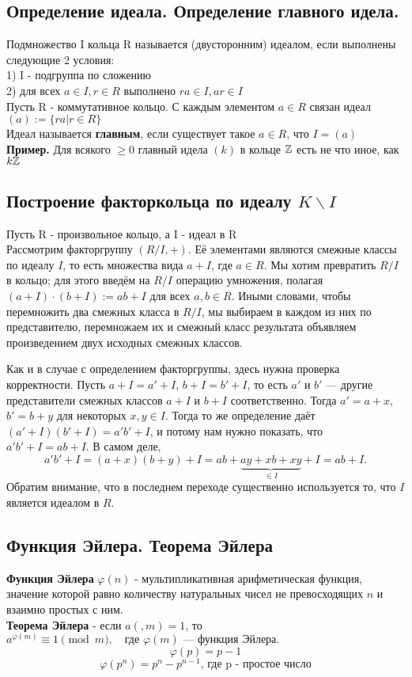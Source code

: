 \subsection{Определение идеала. Определение главного идела.}
Подмножество I кольца R называется (двусторонним) идеалом, если выполнены следующие 2 условия: \\
1) I - подгруппа по сложению \\
2) для всех $a\in I, r\in R$ выполнено $ra\in I, ar\in I$\\
Пусть R - коммутативное кольцо. С каждым элементом $a\in R$ связан идеал $(a):=\{ra| r\in R\}$\\
Идеал называется \textbf{главным}, если существует такое $a\in R$, что $I = (a)$\\
\textbf{Пример.} Для всякого $\geqslant0$ главный идела $(k)$ в кольце $\mathbb{Z}$ есть не что иное, как $k\mathbb{Z}$\\
\subsection{Построение факторкольца по идеалу $K\backslash I$}
Пусть R - произвольное кольцо, а I - идеал в R \\
Рассмотрим факторгруппу $(R/I,+)$. Её элементами являются смежные классы по идеалу $I$, то есть множества вида $a + I$, где $a \in R$. Мы хотим превратить $R/I$ в кольцо; для этого введём на $R/I$ операцию умножения, полагая $(a + I) \cdot (b + I) := ab + I$ для всех $a,b \in R$. Иными словами, чтобы перемножить два смежных класса в $R/I$, мы выбираем в каждом из них по представителю, перемножаем их и смежный класс результата объявляем произведением двух исходных смежных классов.

Как и в случае с определением факторгруппы, здесь нужна проверка корректности. Пусть $a + I = a' + I$, $b + I = b' + I$, то есть $a'$ и $b'$ --- другие представители смежных классов $a + I$ и $b + I$ соответственно. Тогда $a' = a + x$, $b' = b + y$ для некоторых $x,y \in I$. Тогда то же определение даёт $(a' + I)(b' + I) = a'b' + I$, и потому нам нужно показать, что $a'b' + I = ab + I$. В самом деле,
\[
a'b' + I = (a + x)(b + y) + I = ab + \underbrace{ay + xb + xy}_{\in I} + I = ab + I.
\]
Обратим внимание, что в последнем переходе существенно используется то, что $I$ является идеалом в $R$.\\
\subsection{Функция Эйлера. Теорема Эйлера} 
\textbf{Функция Эйлера}  $\varphi(n)$ - мультипликативная арифметическая функция, значение которой равно количеству натуральных чисел не превосходящих $n$ и взаимно простых с ним.\\
\textbf{Теорема Эйлера} - если $a(,m) = 1$, то $a^{\varphi(m)} \equiv 1 \pmod{m}, \quad \text{где } \varphi(m) \text{ — функция Эйлера.}$\\
$$\varphi(p) = p-1$$
$$\varphi(p^n) =p^n-p^{n-1}\text{,  где p - простое число}$$
